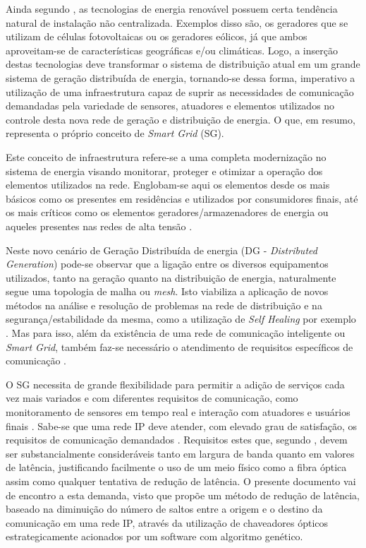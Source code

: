 \documentclass[12pt]{article}
\begin{document}
Ainda segundo \cite{Art_Gungor2013}, as tecnologias de energia renovável possuem certa tendência natural de instalação não centralizada. Exemplos disso são, os geradores que se utilizam de células fotovoltaicas ou os geradores eólicos, já que ambos aproveitam-se de características geográficas e/ou climáticas. Logo, a inserção destas tecnologias deve transformar o sistema de distribuição atual em um grande sistema de geração distribuída de energia, tornando-se dessa forma, imperativo a utilização de uma infraestrutura capaz de suprir as necessidades de comunicação demandadas pela variedade de sensores, atuadores e elementos utilizados no controle desta nova rede de geração e distribuição de energia. O que, em resumo, representa o próprio conceito de \emph{Smart Grid} (SG).

Este conceito de infraestrutura refere-se a uma completa modernização no sistema de energia visando monitorar, proteger e otimizar a operação dos elementos utilizados na rede. Englobam-se aqui os elementos desde os mais básicos como os presentes em residências e utilizados por consumidores finais, até os mais críticos como os elementos geradores/armazenadores de energia ou aqueles presentes nas redes de alta tensão \cite{Conf_Sood2009}.

Neste novo cenário de Geração Distribuída de energia (DG - \emph{Distributed Generation}) pode-se observar que a ligação entre os diversos equipamentos utilizados, tanto na geração quanto na distribuição de energia, naturalmente segue uma topologia de malha ou \emph{mesh}. Isto viabiliza a aplicação de novos métodos na análise e resolução de problemas na rede de distribuição e na segurança/estabilidade da mesma, como a utilização de \emph{Self Healing} por exemplo \cite{Art_Amin2006}. Mas para isso, além da existência de uma rede de comunicação inteligente ou \emph{Smart Grid}, também faz-se necessário o atendimento de requisitos específicos de comunicação \cite{Conf_Sood2009}.

O SG necessita de grande flexibilidade para permitir a adição de serviços cada vez mais variados e com diferentes requisitos de comunicação, como monitoramento de sensores em tempo real e interação com atuadores e usuários finais \cite{Art_Aggarwal2010}. Sabe-se que uma rede IP deve atender, com elevado grau de satisfação, os requisitos de comunicação demandados \cite{Conf_Lobo2008}. Requisitos estes que, segundo \cite{Art_Aggarwal2010}, devem ser substancialmente consideráveis tanto em largura de banda quanto em valores de latência, justificando facilmente o uso de um meio físico como a fibra óptica assim como qualquer tentativa de redução de latência. O presente documento vai de encontro a esta demanda, visto que propõe um método de redução de latência, baseado na diminuição do número de saltos entre a origem e o destino da comunicação em uma rede IP, através da utilização de chaveadores ópticos estrategicamente acionados por um software com algoritmo genético.
\end{document}
